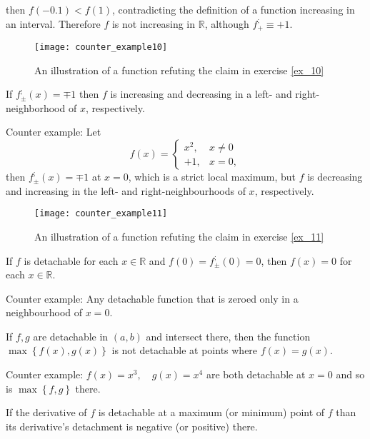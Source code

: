 \documentclass[11pt]{book}
\begin{document}
then $f\left(-0.1\right)<f\left(1\right)$, contradicting the definition
of a function increasing in an interval. Therefore $f$ is not increasing
in $\mathbb{R}$, although $f_{+}^{;}\equiv+1$.

\begin{figure}[h!]
\texttt{[image: counter\_example10]}
\label{counter_example7}
\caption{An illustration of a function refuting the claim in exercise \ref{ex_10}}
\end{figure}

\begin{exercise}\label{ex_11}If $f_{\pm}^{;}\left(x\right)=\mp1$ then $f$ is increasing and
decreasing in a left- and right-neighborhood of $x$, respectively.
\end{exercise}

Counter example: Let
\[
f\left(x\right)=\begin{cases}
x^{2}, & x\neq0\\
+1, & x=0,
\end{cases}
\]
then $f_{\pm}^{;}\left(x\right)=\mp1$ at $x=0$, which is a strict
local maximum, but $f$ is decreasing and increasing in the left-
and right-neighbourhoods of $x$, respectively.

\begin{figure}[h!]
\texttt{[image: counter\_example11]}
\label{counter_example11}
\caption{An illustration of a function refuting the claim in exercise \ref{ex_11}}
\end{figure}

\begin{exercise}If $f$ is detachable for each $x\in\mathbb{R}$ and $f\left(0\right)=f_{\pm}^{;}\left(0\right)=0$,
then $f\left(x\right)=0$ for each $x\in\mathbb{R}$. 
\end{exercise}

Counter example: Any detachable function that is zeroed only in
a neighbourhood of $x=0$.

\begin{exercise}If $f,g$ are detachable in $\left(a,b\right)$ and intersect there,
then the function $\max\left\{ f\left(x\right),g\left(x\right)\right\} $
is not detachable at points where $f\left(x\right)=g\left(x\right)$.
\end{exercise}

Counter example: $f\left(x\right)=x^{3},\quad g\left(x\right)=x^{4}$
are both detachable at $x=0$ and so is $\max\left\{ f,g\right\} $
there.


\begin{exercise}If the derivative of $f$ is detachable at a maximum (or minimum)
point of $f$ than its derivative's detachment is negative (or positive)
there.
\end{exercise}
\end{document}
